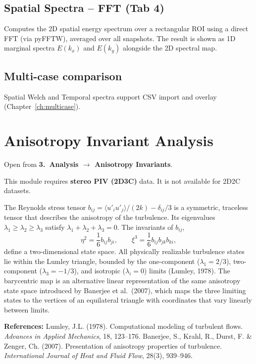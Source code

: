 \documentclass[11pt, a4paper]{report}
\newcommand{\uipth}[1]{\textbf{\textcolor{upblue}{#1}}}
\begin{document}
\section{Spatial Spectra -- FFT (Tab 4)}

Computes the 2D spatial energy spectrum over a rectangular ROI using a direct FFT (via pyFFTW), averaged over all snapshots. The result is shown as 1D marginal spectra $E(k_x)$ and $E(k_y)$ alongside the 2D spectral map.

\section{Multi-case comparison}

Spatial Welch and Temporal spectra support CSV import and overlay (Chapter~\ref{ch:multicase}).

\chapter{Anisotropy Invariant Analysis}
\label{ch:anisotropy}

Open from \uipth{3.\ Analysis $\to$ Anisotropy Invariants}.

\begin{notebox}
This module requires \textbf{stereo PIV (2D3C)} data. It is not available for 2D2C datasets.
\end{notebox}

The Reynolds stress tensor $b_{ij} = \langle u'_i u'_j \rangle / (2k) - \delta_{ij}/3$ is a symmetric, traceless tensor that describes the anisotropy of the turbulence. Its eigenvalues $\lambda_1 \geq \lambda_2 \geq \lambda_3$ satisfy $\lambda_1 + \lambda_2 + \lambda_3 = 0$. The invariants of $b_{ij}$,
\[
\eta^2 = \frac{1}{6} b_{ij} b_{ji}, \qquad \xi^3 = \frac{1}{6} b_{ij} b_{jk} b_{ki},
\]
define a two-dimensional state space. All physically realizable turbulence states lie within the Lumley triangle, bounded by the one-component ($\lambda_1 = 2/3$), two-component ($\lambda_3 = -1/3$), and isotropic ($\lambda_i = 0$) limits (Lumley, 1978). The barycentric map is an alternative linear representation of the same anisotropy state space introduced by Banerjee et al.\ (2007), which maps the three limiting states to the vertices of an equilateral triangle with coordinates that vary linearly between limits.

\noindent\textbf{References:} Lumley, J.L. (1978). Computational modeling of turbulent flows. \textit{Advances in Applied Mechanics}, 18, 123--176. Banerjee, S., Krahl, R., Durst, F. \& Zenger, Ch. (2007). Presentation of anisotropy properties of turbulence. \textit{International Journal of Heat and Fluid Flow}, 28(3), 939--946.
\end{document}
